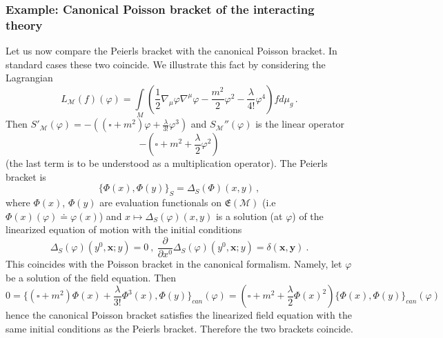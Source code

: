 \documentclass[12pt]{article}
\newcommand{\E}{\mathfrak{E}}
\newcommand{\Mcal}{\mathcal{M}}
\newcommand{\la}{\lambda}
\newcommand{\ph}{\varphi}
\newcommand{\Poi}[2]{\{#1,#2\}}
\newcommand{\1}{\mathds{1}}                         %
\newcommand{\pa}{\partial}                              %
\newcommand{\be}{\begin{equation}}
\newcommand{\ee}{\end{equation}}
\begin{document}
{\subsubsection{Example: Canonical Poisson bracket of the interacting theory}
Let us now compare the Peierls bracket with the canonical Poisson bracket. In standard cases these two coincide. We illustrate this fact by considering the Lagrangian
\[
L_\Mcal(f)(\ph)=\int\limits_M \left(\frac{1}{2}\nabla_\mu\ph\nabla^\mu\ph-\frac{m^2}{2}\ph^2-\frac{\la}{4!}\ph^4\right)fd\mu_g\,.
\]
Then $S'_\Mcal(\ph)=-\left((\square+m^2)\ph+\frac{\lambda}{3!}\ph^3\right)$ and $S_\Mcal''(\ph)$ is the linear operator
\be
-\left(\square +m^2+\frac{\lambda}{2}\ph^2\right)
\ee
(the last term is to be understood as a multiplication operator). The Peierls bracket is
\be
\Poi{\Phi(x)}{\Phi(y)}_S=\Delta_S(\Phi)(x,y)\,,
\ee
where $\Phi(x)$, $\Phi(y)$ are evaluation functionals on $\E(\Mcal)$ (i.e $\Phi(x)(\ph)\doteq \ph(x)$)
and   $x\mapsto \Delta_S(\ph)(x,y)$ is a solution (at $\ph$) of the  linearized equation of motion with the initial conditions
\be
\Delta_S(\ph)(y^0,\mathbf{x};y)=0\ ,\ \frac{\pa}{\pa x^0}\Delta_S(\ph)(y^0,\mathbf{x};y)=\delta(\mathbf{x},\mathbf{y})\ .
\ee
This coincides with the Poisson bracket in the canonical formalism. Namely, let $\ph$ be a solution of the field equation.
Then
\be
0=\Big\{(\square +m^2)\Phi(x)+\frac{\lambda}{3!}\Phi^3(x),\Phi(y)\Big\}_
{can}(\ph)=(\square +m^2+\frac{\lambda}{2}\Phi(x)^2)\Big\{\Phi(x),\Phi(y)\Big\}_{can}(\ph)
\ee
hence the canonical Poisson bracket satisfies the linearized field equation with the same initial conditions as the Peierls bracket.  Therefore the two brackets coincide.
}
\end{document}
